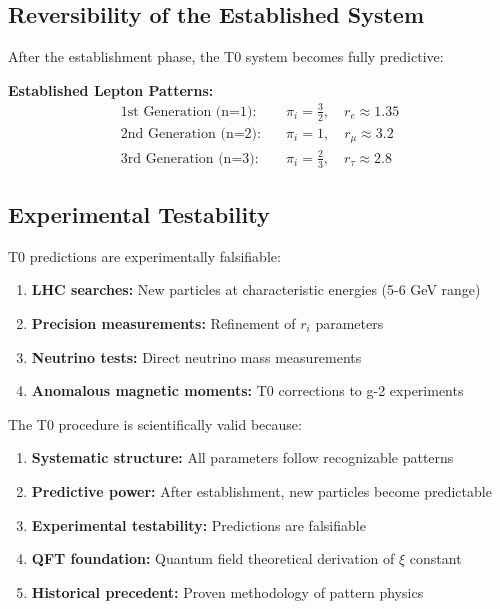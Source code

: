 	\subsection{Reversibility of the Established System}
	\label{subsec:reversibility}
	
	After the establishment phase, the T0 system becomes fully predictive:
	
	\textbf{Established Lepton Patterns:}
	\begin{align}
		\text{1st Generation (n=1):} \quad &\pi_i = \frac{3}{2}, \quad r_e \approx 1.35 \\
		\text{2nd Generation (n=2):} \quad &\pi_i = 1, \quad r_\mu \approx 3.2 \\
		\text{3rd Generation (n=3):} \quad &\pi_i = \frac{2}{3}, \quad r_\tau \approx 2.8
	\end{align}
	
	\subsection{Experimental Testability}
	\label{subsec:experimental_testability}
	
	T0 predictions are experimentally falsifiable:
	
	\begin{enumerate}
		\item \textbf{LHC searches:} New particles at characteristic energies (5-6 GeV range)
		\item \textbf{Precision measurements:} Refinement of $r_i$ parameters
		\item \textbf{Neutrino tests:} Direct neutrino mass measurements
		\item \textbf{Anomalous magnetic moments:} T0 corrections to g-2 experiments
	\end{enumerate}
	
	The T0 procedure is scientifically valid because:
	
	\begin{enumerate}
		\item \textbf{Systematic structure:} All parameters follow recognizable patterns
		\item \textbf{Predictive power:} After establishment, new particles become predictable
		\item \textbf{Experimental testability:} Predictions are falsifiable
		\item \textbf{QFT foundation:} Quantum field theoretical derivation of $\xi$ constant
		\item \textbf{Historical precedent:} Proven methodology of pattern physics
	\end{enumerate}
	
